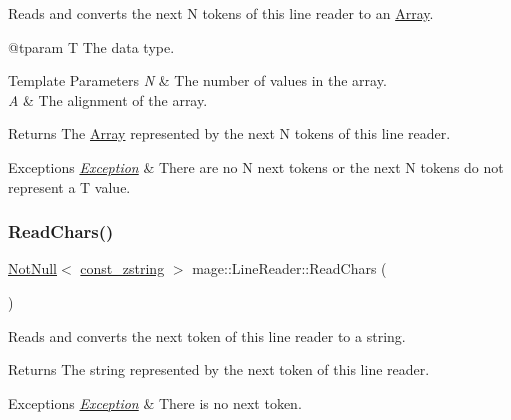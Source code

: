 Reads and converts the next {\ttfamily N} tokens of this line reader to an {\ttfamily \mbox{\hyperlink{structmage_1_1_array}{Array}}}.

@tparam T The data type. 
\begin{DoxyTemplParams}{Template Parameters}
{\em N} & The number of values in the array. \\
\hline
{\em A} & The alignment of the array. \\
\hline
\end{DoxyTemplParams}
\begin{DoxyReturn}{Returns}
The {\ttfamily \mbox{\hyperlink{structmage_1_1_array}{Array}}} represented by the next {\ttfamily N} tokens of this line reader. 
\end{DoxyReturn}

\begin{DoxyExceptions}{Exceptions}
{\em \mbox{\hyperlink{classmage_1_1_exception}{Exception}}} & There are no {\ttfamily N} next tokens or the next {\ttfamily N} tokens do not represent a {\ttfamily T} value. \\
\hline
\end{DoxyExceptions}
\mbox{\label{classmage_1_1_line_reader_afcb163cbc75ad1650437d809bbbc2d9b}} 
\subsubsection{\texorpdfstring{Read\+Chars()}{ReadChars()}}
{\footnotesize\ttfamily \mbox{\hyperlink{namespacemage_a8769f9d670d6b585ea306cb1062af94b}{Not\+Null}}$<$ \mbox{\hyperlink{namespacemage_abfd9206dc607ceb5d13ec68bf075a5c0}{const\+\_\+zstring}} $>$ mage\+::\+Line\+Reader\+::\+Read\+Chars (\begin{DoxyParamCaption}{ }\end{DoxyParamCaption})\hspace{0.3cm}{\ttfamily [protected]}}

Reads and converts the next token of this line reader to a string.

\begin{DoxyReturn}{Returns}
The string represented by the next token of this line reader. 
\end{DoxyReturn}

\begin{DoxyExceptions}{Exceptions}
{\em \mbox{\hyperlink{classmage_1_1_exception}{Exception}}} & There is no next token. \\
\hline
\end{DoxyExceptions}
\mbox{\label{classmage_1_1_line_reader_ad4236487534d5dba6582613317317092}} 
